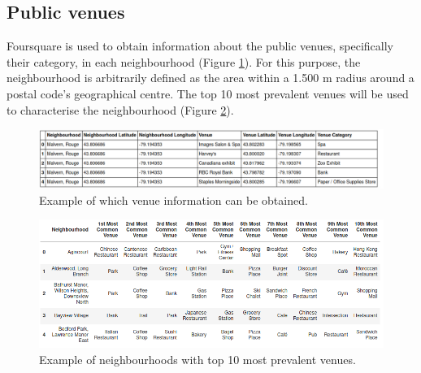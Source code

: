 \documentclass{article}
\begin{document}
\subsection{Public venues}
Foursquare is used to obtain information about the public venues, specifically their category, in each neighbourhood (Figure \ref{fig:venues}). For this purpose, the neighbourhood is arbitrarily defined as the area within a 1.500 m radius around a postal code's geographical centre. The top 10 most prevalent venues will be used to characterise the neighbourhood (Figure \ref{fig:grouped}).
\begin{figure}[ht]
 \includegraphics[width=\textwidth]{pics/venues.png}
 \caption{Example of which venue information can be obtained.}\label{fig:venues}
\end{figure}
\begin{figure}[ht]
 \includegraphics[width=\textwidth]{pics/grouped.png}
 \caption{Example of neighbourhoods with top 10 most prevalent venues.}\label{fig:grouped}
\end{figure}
\end{document}
